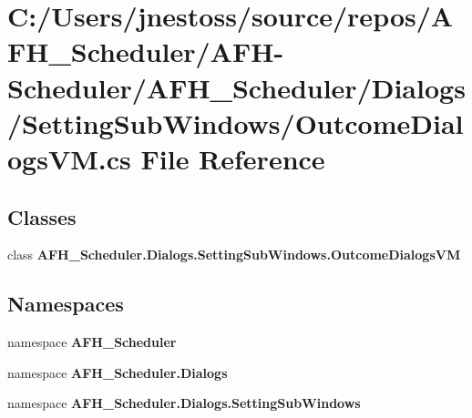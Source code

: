 \section{C\+:/\+Users/jnestoss/source/repos/\+A\+F\+H\+\_\+\+Scheduler/\+A\+F\+H-\/\+Scheduler/\+A\+F\+H\+\_\+\+Scheduler/\+Dialogs/\+Setting\+Sub\+Windows/\+Outcome\+Dialogs\+VM.cs File Reference}
\label{_outcome_dialogs_v_m_8cs}
\subsection*{Classes}
\begin{DoxyCompactItemize}
\item 
class \textbf{ A\+F\+H\+\_\+\+Scheduler.\+Dialogs.\+Setting\+Sub\+Windows.\+Outcome\+Dialogs\+VM}
\end{DoxyCompactItemize}
\subsection*{Namespaces}
\begin{DoxyCompactItemize}
\item 
namespace \textbf{ A\+F\+H\+\_\+\+Scheduler}
\item 
namespace \textbf{ A\+F\+H\+\_\+\+Scheduler.\+Dialogs}
\item 
namespace \textbf{ A\+F\+H\+\_\+\+Scheduler.\+Dialogs.\+Setting\+Sub\+Windows}
\end{DoxyCompactItemize}
